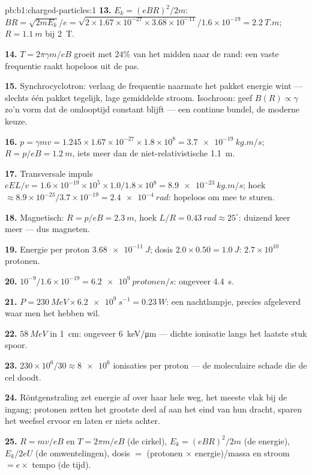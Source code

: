 \begin{solution}{pb:b1:charged-particles:1}
\textbf{13.} $E_k = (eBR)^2/2m$: $BR = \sqrt{2mE_k}/e = \sqrt{2 \times 1.67\times
10^{-27} \times 3.68\times10^{-11}}/1.6\times10^{-19} = \qty{2.2}{T.m}$; $R =
\qty{1.1}{m}$ bij \qty{2}{T}.

\textbf{14.} $T = 2\pi\gamma m/eB$ groeit met $24\%$ van het midden naar de rand: een
vaste frequentie raakt hopeloos uit de pas.

\textbf{15.} Synchrocyclotron: verlaag de frequentie naarmate het pakket energie
wint --- slechts één pakket tegelijk, lage gemiddelde stroom. Isochroon:
geef $B(R) \propto \gamma$ zo'n vorm dat de omlooptijd constant blijft --- een continue
bundel, de moderne keuze.

\textbf{16.} $p = \gamma mv = 1.245 \times 1.67\times10^{-27} \times 1.8\times10^8
= \qty{3.7e-19}{kg.m/s}$; $R = p/eB = \qty{1.2}{m}$, iets meer dan
de niet-relativistische \qty{1.1}{m}.

\textbf{17.} Transversale impuls $eEL/v = 1.6\times10^{-19} \times 10^5 \times
1.0/1.8\times10^8 = \qty{8.9e-23}{kg.m/s}$; hoek $\approx 8.9\times10^{-23}/
3.7\times10^{-19} = \qty{2.4e-4}{rad}$: hopeloos om mee te sturen.

\textbf{18.} Magnetisch: $R = p/eB = \qty{2.3}{m}$, hoek $L/R = \qty{0.43}{rad}
\approx 25^\circ$: duizend keer meer --- dus magneten.

\textbf{19.} Energie per proton $\qty{3.68e-11}{J}$; dosis $2.0 \times 0.50 =
\qty{1.0}{J}$: $2.7\times10^{10}$ protonen.

\textbf{20.} $10^{-9}/1.6\times10^{-19} = \qty{6.2e9}{protonen/s}$: ongeveer
\qty{4.4}{s}.

\textbf{21.} $P = \qty{230}{MeV} \times \qty{6.2e9}{s^{-1}} = \qty{0.23}{W}$:
een nachtlampje, precies afgeleverd waar men het hebben wil.

\textbf{22.} $\qty{58}{MeV}$ in \qty{1}{cm}: ongeveer \qty{6}{keV/\micro m} ---
dichte ionisatie langs het laatste stuk spoor.

\textbf{23.} $230\times10^6/30 \approx \num{8e6}$ ionisaties per proton ---
de moleculaire schade die de cel doodt.

\textbf{24.} Röntgenstraling zet energie af over haar hele weg, het meeste vlak bij
de ingang; protonen zetten het grootste deel af aan het eind van hun dracht,
sparen het weefsel ervoor en laten er niets achter.

\textbf{25.} $R = mv/eB$ en $T = 2\pi m/eB$ (de cirkel), $E_k = (eBR)^2/2m$
(de energie), $E_k/2eU$ (de omwentelingen), dosis $=$ (protonen $\times$ energie)/massa
en stroom $= e \times$ tempo (de tijd).
\end{solution}

